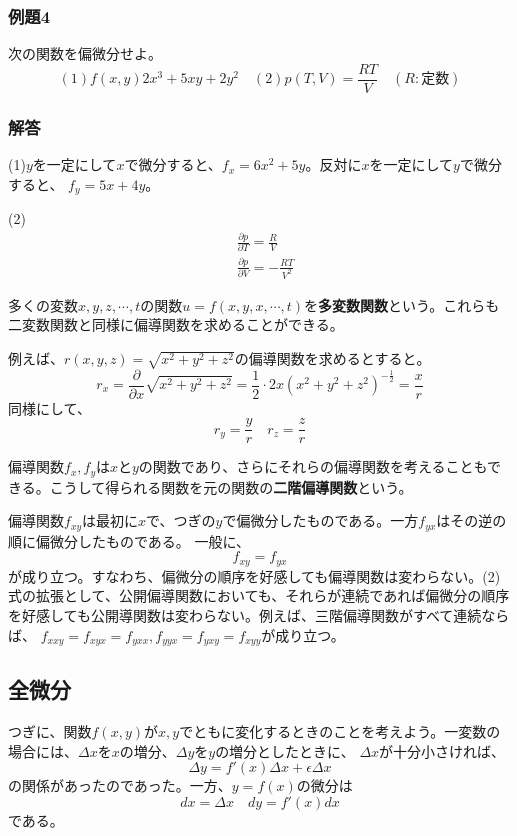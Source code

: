 \documentclass[a4j,dvipdfmx]{jsarticle}
\begin{document}
\subsubsection*{例題4}
次の関数を偏微分せよ。
\begin{equation*}
    (1)f(x,y)2x^3+5xy+2y^2\quad(2)p(T,V)=\frac{RT}{V}\quad(R:\text{定数})
\end{equation*}
\subsubsection*{解答}
(1)$y$を一定にして$x$で微分すると、$f_x=6x^2+5y$。反対に$x$を一定にして$y$で微分すると、
$f_y=5x+4y$。

(2)\begin{align*}
    &\frac{\partial p}{\partial T}=\frac{R}{V}\\
    &\frac{\partial p}{\partial V}=-\frac{RT}{V^2}
\end{align*}

多くの変数$x,y,z,\cdots ,t$の関数$u=f(x,y,x,\cdots,t)$を\textbf{多変数関数}という。これらも二変数関数と同様に偏導関数を求めることができる。

例えば、$\displaystyle r(x,y,z)=\sqrt{x^2+y^2+z^2}$の偏導関数を求めるとすると。
\begin{equation*}
    r_x=\frac{\partial}{\partial x}\sqrt{x^2+y^2+z^2}=\frac{1}{2}\cdot 2x(x^2+y^2+z^2)^{-\frac{1}{2}}=\frac{x}{r}
\end{equation*}
同様にして、
\begin{equation*}
    r_y=\frac{y}{r}\quad r_z=\frac{z}{r}
\end{equation*}

偏導関数$f_x,f_y$は$x$と$y$の関数であり、さらにそれらの偏導関数を考えることもできる。こうして得られる関数を元の関数の\textbf{二階偏導関数}という。

偏導関数$f_{xy}$は最初に$x$で、つぎの$y$で偏微分したものである。一方$f_{yx}$はその逆の順に偏微分したものである。
一般に、
\begin{equation}
    f_{xy}=f_{yx}
\end{equation}
が成り立つ。すなわち、偏微分の順序を好感しても偏導関数は変わらない。(2)式の拡張として、公開偏導関数においても、それらが連続であれば偏微分の順序を好感しても公開導関数は変わらない。例えば、三階偏導関数がすべて連続ならば、
$f_{xxy}=f_{xyx}=f_{yxx},f_{yyx}=f_{yxy}=f_{xyy}$が成り立つ。
\newpage
\subsection{全微分}
つぎに、関数$f(x,y)$が$x,y$でともに変化するときのことを考えよう。一変数の場合には、$\Delta x$を$x$の増分、$\Delta y$を$y$の増分としたときに、
$\Delta x$が十分小さければ、
\begin{equation}
    \Delta y=f'(x)\Delta x+\epsilon \Delta x
\end{equation}
の関係があったのであった。一方、$y=f(x)$の微分は
\begin{equation}
    dx=\Delta x\quad dy=f'(x)dx
\end{equation}
である。
\end{document}

